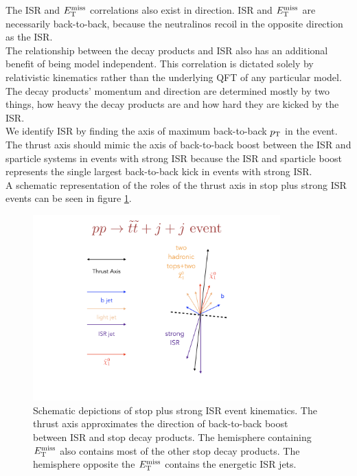 \indent The ISR and $E_{\mathrm{T}}^{\mathrm{miss}}$ correlations also exist in direction.  ISR and $E_{\mathrm{T}}^{\mathrm{miss}}$ are necessarily back-to-back, because the neutralinos recoil in the opposite direction as the ISR.  \\%

\indent The relationship between the decay products and ISR also has an additional benefit of being model independent.  This correlation is dictated solely by relativistic kinematics rather than the underlying QFT of any particular model.  The decay products' momentum and direction are determined mostly by two things, how heavy the decay products are and how hard they are kicked by the ISR.  \\

\indent We identify ISR by finding the axis of maximum back-to-back $p_{\mathrm{T}}$ in the event.  The thrust axis should mimic the axis of back-to-back boost between the ISR and sparticle systems in events with strong ISR because the ISR and sparticle boost represents the single largest back-to-back kick in events with strong ISR.  \\

\indent A schematic representation of the roles of the thrust axis in stop plus strong ISR events can be seen in figure \ref{fig:ISR:ttbar_sig_example}. \\

\begin{figure}[h!]
  \centering
	\includegraphics[width=0.85\textwidth]{./figures/strategy/ISR_signal.png}
	\caption{Schematic depictions of stop plus strong ISR event kinematics.  The thrust axis approximates the direction of back-to-back boost between ISR and stop decay products.  The hemisphere containing $E_{\mathrm{T}}^{\mathrm{miss}}$ also contains most of the other stop decay products.  The hemisphere opposite the $E_{\mathrm{T}}^{\mathrm{miss}}$ contains the energetic ISR jets. }
	\label{fig:ISR:ttbar_sig_example}
\end{figure}

